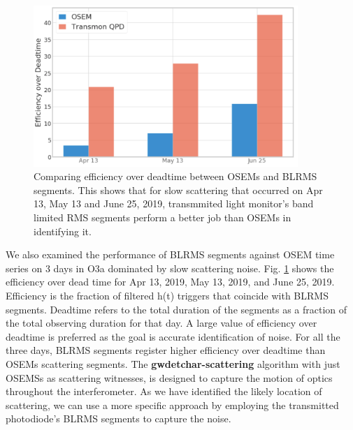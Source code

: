 \documentclass[12pt]{iopart}
\begin{document}
\par

\begin{figure}[h]
    \centering
    \includegraphics[width=10cm]{osemtransmon5.png}
    \caption{Comparing efficiency over deadtime between OSEMs and BLRMS segments. This shows that for slow scattering that occurred on Apr 13, May 13 and June 25, 2019, transmmited light monitor's band limited RMS segments perform a better job than OSEMs in identifying it.}
    \label{fig:osemtrans}
\end{figure}

We also examined the performance of BLRMS segments against OSEM time series on 3 days in O3a dominated by slow scattering noise. Fig. \ref{fig:osemtrans} shows the efficiency over dead time for Apr 13, 2019, May 13, 2019, and June 25, 2019. Efficiency is the fraction of filtered h(t) triggers that coincide with BLRMS segments. Deadtime refers to the total duration of the segments as a fraction of the total observing duration for that day. A large value of efficiency over deadtime is preferred as the goal is accurate identification of  noise. For all the three days, BLRMS segments register higher efficiency over deadtime than OSEMs scattering segments. %
The \textbf{gwdetchar-scattering} algorithm with just OSEMSs as scattering witnesses, is designed to capture the motion of optics throughout the interferometer. 
As we have identified the likely location of scattering, we can use a more specific approach by employing the transmitted photodiode’s BLRMS segments to capture the noise. 
\end{document}
